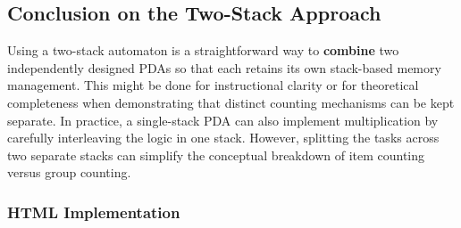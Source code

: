 \documentclass[11pt]{article}
\begin{document}
\subsection*{Conclusion on the Two-Stack Approach}

Using a two-stack automaton is a straightforward way to \textbf{combine} two independently designed PDAs so that each retains its own stack-based memory management. This might be done for instructional clarity or for theoretical completeness when demonstrating that distinct counting mechanisms can be kept separate. In practice, a single-stack PDA can also implement multiplication by carefully interleaving the logic in one stack. However, splitting the tasks across two separate stacks can simplify the conceptual breakdown of item counting versus group counting.


\clearpage
\subsubsection*{HTML Implementation}



\printbibliography
\end{document}
